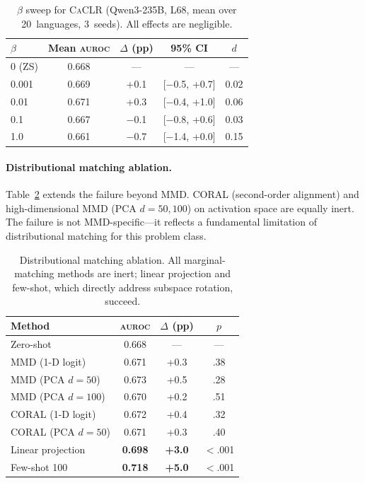 \documentclass[11pt,a4paper]{article}
\newcommand{\aur}{\textsc{auroc}}
\newcommand{\caclr}{\textsc{CaCLR}}
\begin{document}
\begin{table}[t]
\centering
\small
\begin{tabular}{lcccc}
\toprule
$\beta$ & \textbf{Mean \aur{}} & \textbf{$\Delta$ (pp)} & \textbf{95\% CI} & \textbf{$d$} \\
\midrule
0 (ZS) & 0.668 & --- & --- & --- \\
0.001 & 0.669 & +0.1 & [$-$0.5, +0.7] & 0.02 \\
0.01 & 0.671 & +0.3 & [$-$0.4, +1.0] & 0.06 \\
0.1 & 0.667 & $-$0.1 & [$-$0.8, +0.6] & 0.03 \\
1.0 & 0.661 & $-$0.7 & [$-$1.4, +0.0] & 0.15 \\
\bottomrule
\end{tabular}
\caption{$\beta$ sweep for \caclr{} (Qwen3-235B, L68, mean over 20~languages, 3~seeds). All effects are negligible.}
\label{tab:beta_sweep}
\end{table}

\paragraph{Distributional matching ablation.} Table~\ref{tab:dist_matching} extends the failure beyond MMD. CORAL (second-order alignment) and high-dimensional MMD (PCA $d=50, 100$) on activation space are equally inert. The failure is not MMD-specific---it reflects a fundamental limitation of distributional matching for this problem class.

\begin{table}[t]
\centering
\small
\begin{tabular}{lccc}
\toprule
\textbf{Method} & \textbf{\aur{}} & \textbf{$\Delta$ (pp)} & \textbf{$p$} \\
\midrule
Zero-shot & 0.668 & --- & --- \\
MMD (1-D logit) & 0.671 & +0.3 & .38 \\
MMD (PCA $d{=}50$) & 0.673 & +0.5 & .28 \\
MMD (PCA $d{=}100$) & 0.670 & +0.2 & .51 \\
CORAL (1-D logit) & 0.672 & +0.4 & .32 \\
CORAL (PCA $d{=}50$) & 0.671 & +0.3 & .40 \\
\midrule
Linear projection & \textbf{0.698} & \textbf{+3.0} & $<$.001 \\
Few-shot 100 & \textbf{0.718} & \textbf{+5.0} & $<$.001 \\
\bottomrule
\end{tabular}
\caption{Distributional matching ablation. All marginal-matching methods are inert; linear projection and few-shot, which directly address subspace rotation, succeed.}
\label{tab:dist_matching}
\end{table}
\end{document}
